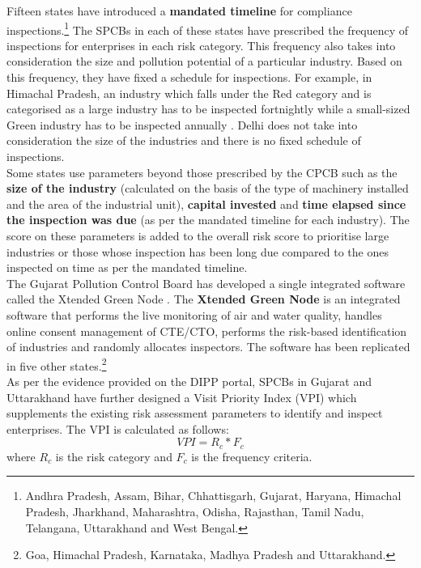 \documentclass[a4paper, 12pt]{article}
\begin{document}
	Fifteen states have introduced a \textbf{mandated timeline} for compliance inspections.\footnote{Andhra Pradesh, Assam, Bihar, Chhattisgarh, Gujarat, Haryana, Himachal Pradesh, Jharkhand, Maharashtra, Odisha, Rajasthan, Tamil Nadu, Telangana, Uttarakhand and West Bengal.} The SPCBs in each of these states have prescribed the frequency of inspections for enterprises in each risk category. This frequency also takes into consideration the size and pollution potential of a particular industry. Based on this frequency, they have fixed a schedule for inspections. For example, in Himachal Pradesh, an industry which falls under the Red category and is categorised as a large industry has to be inspected fortnightly while a small-sized Green industry has to be inspected annually \parencite{HPPCB}. Delhi does not take into consideration the size of the industries and there is no fixed schedule of inspections. \\
	
	Some states use parameters beyond those prescribed by the CPCB such as the \textbf{size of the industry} (calculated on the basis of the type of machinery installed and the area of the industrial unit), \textbf{capital invested} and \textbf{time elapsed since the inspection was due} (as per the mandated timeline for each industry). The score on these parameters is added to the overall risk score to prioritise large industries or those whose inspection has been long due compared to the ones inspected on time as per the mandated timeline. \\
	
	The Gujarat Pollution Control Board has developed a single integrated software called the Xtended Green Node \parencite{GPCB}. The \textbf{Xtended Green Node} is an integrated software that performs the live monitoring of air and water quality, handles online consent management of CTE/CTO, performs the risk-based identification of industries and randomly allocates inspectors. The software has been replicated in five other states.\footnote{Goa, Himachal Pradesh, Karnataka, Madhya Pradesh and Uttarakhand.} \\
	
	As per the evidence provided on the DIPP portal, SPCBs in Gujarat \parencite{GPCB} and Uttarakhand \parencite{UKPCB} have further designed a Visit Priority Index (VPI) which supplements the existing risk assessment parameters to identify and inspect enterprises. The VPI is calculated as follows: $$VPI = R_c *F_c$$ where $R_c$ is the risk category and $F_c$ is the frequency criteria. \\
	
\end{document}
